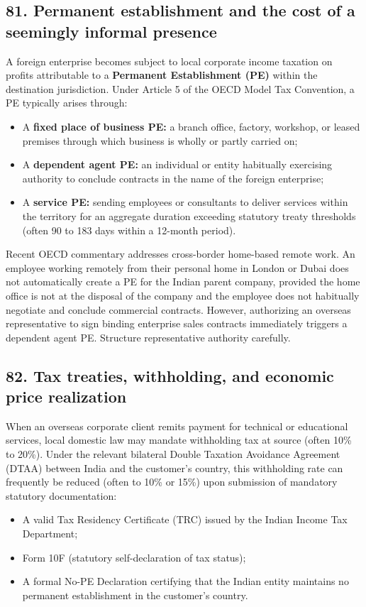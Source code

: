 \subsection{81. Permanent establishment and the cost of a seemingly informal presence}

A foreign enterprise becomes subject to local corporate income taxation on profits attributable to a \textbf{Permanent Establishment (PE)} within the destination jurisdiction. Under Article 5 of the OECD Model Tax Convention, a PE typically arises through:
\begin{itemize}
    \item A \textbf{fixed place of business PE:} a branch office, factory, workshop, or leased premises through which business is wholly or partly carried on;
    \item A \textbf{dependent agent PE:} an individual or entity habitually exercising authority to conclude contracts in the name of the foreign enterprise;
    \item A \textbf{service PE:} sending employees or consultants to deliver services within the territory for an aggregate duration exceeding statutory treaty thresholds (often 90 to 183 days within a 12-month period).
\end{itemize}

Recent OECD commentary addresses cross-border home-based remote work. An employee working remotely from their personal home in London or Dubai does not automatically create a PE for the Indian parent company, provided the home office is not at the disposal of the company and the employee does not habitually negotiate and conclude commercial contracts. However, authorizing an overseas representative to sign binding enterprise sales contracts immediately triggers a dependent agent PE. Structure representative authority carefully.

\subsection{82. Tax treaties, withholding, and economic price realization}

When an overseas corporate client remits payment for technical or educational services, local domestic law may mandate withholding tax at source (often 10\% to 20\%). Under the relevant bilateral Double Taxation Avoidance Agreement (DTAA) between India and the customer's country, this withholding rate can frequently be reduced (often to 10\% or 15\%) upon submission of mandatory statutory documentation:
\begin{itemize}
    \item A valid Tax Residency Certificate (TRC) issued by the Indian Income Tax Department;
    \item Form 10F (statutory self-declaration of tax status);
    \item A formal No-PE Declaration certifying that the Indian entity maintains no permanent establishment in the customer's country.
\end{itemize}

